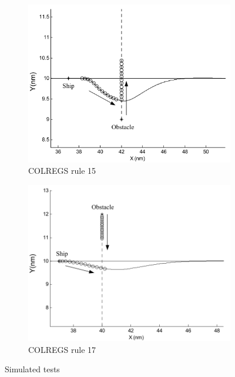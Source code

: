 \begin{figure}[H]
        \begin{subfigure}[b]{0.5\textwidth}
            \centering
            \includegraphics[width=\textwidth]{figs/Lee2004Fuzzy_COLREGS15a.png}
            \caption{\ac{COLREGS} rule 15}
            \label{fig:Lee2004Fuzzy_COLREGS15}
        \end{subfigure}
        \begin{subfigure}[b]{0.45\textwidth}
            \centering
            \includegraphics[width=\textwidth]{figs/Lee2004Fuzzy_COLREGS18.png}
            \caption{\ac{COLREGS} rule 17}
            \label{fig:Lee2004Fuzzy_COLREGS18}
        \end{subfigure}
    
    \caption{Simulated tests \cite{Lee2004Fuzzy}}
    \label{fig:Lee2004Fuzzy_COLREGS_13_14_15_17}
    \end{figure}
    
